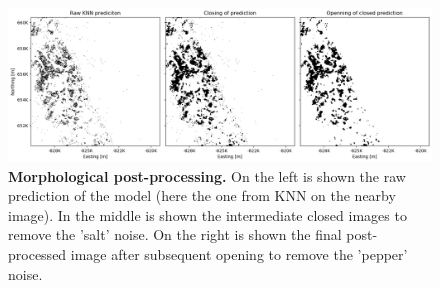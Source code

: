 \documentclass[a4paper, 12pt]{article}
\begin{document}
            \begin{figure}[t!]
                \centering
                \includegraphics[width=1\textwidth]{../Figures/PostProcessing_example.png}
                \caption{\textbf{Morphological post-processing.} On the left is shown the raw prediction of the model (here the one from KNN on the nearby image). In the middle is shown the intermediate closed images to remove the 'salt' noise. On the right is shown the final post-processed image after subsequent opening to remove the 'pepper' noise.}
                \label{fig:postprocessing}
            \end{figure}
\end{document}
